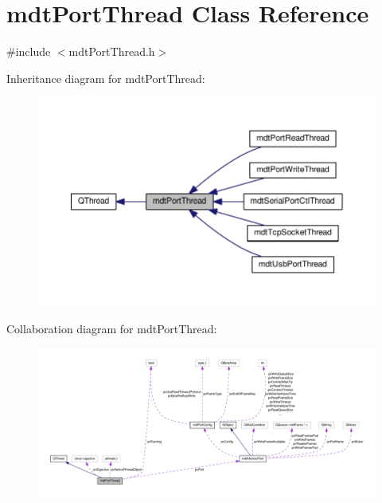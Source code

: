 \hypertarget{classmdt_port_thread}{\section{mdt\-Port\-Thread Class Reference}
\label{classmdt_port_thread}
}


{\ttfamily \#include $<$mdt\-Port\-Thread.\-h$>$}



Inheritance diagram for mdt\-Port\-Thread\-:
\nopagebreak
\begin{figure}[H]
\begin{center}
\leavevmode
\includegraphics[width=350pt]{classmdt_port_thread__inherit__graph}
\end{center}
\end{figure}


Collaboration diagram for mdt\-Port\-Thread\-:\nopagebreak
\begin{figure}[H]
\begin{center}
\leavevmode
\includegraphics[width=350pt]{classmdt_port_thread__coll__graph}
\end{center}
\end{figure}
